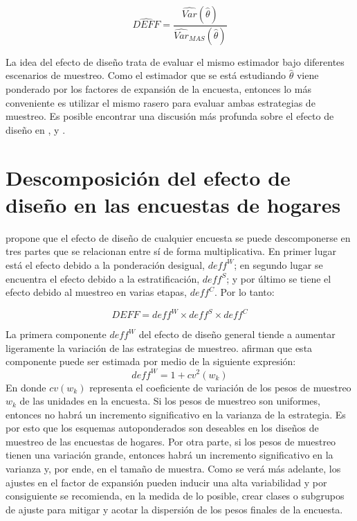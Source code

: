 \documentclass[
  10pt,
  spanish,
]{book}
\begin{document}
\[
\widehat{DEFF} = \frac{\widehat{Var}(\hat\theta)}{\widehat{Var}_{MAS}(\hat{\theta})}
\]

La idea del efecto de diseño trata de evaluar el mismo estimador bajo diferentes escenarios de muestreo. Como el estimador que se está estudiando \(\hat \theta\) viene ponderado por los factores de expansión de la encuesta, entonces lo más conveniente es utilizar el mismo rasero para evaluar ambas estrategias de muestreo. Es posible encontrar una discusión más profunda sobre el efecto de diseño en \citet[sección 4.]{Gambino_2009}, \citet[página 188]{Sarndal_Swensson_Wretman_2003} y \citet[página 101]{Gutierrez_Zhang_Montano_2016}.

\hypertarget{descomposiciuxf3n-del-efecto-de-diseuxf1o-en-las-encuestas-de-hogares}{%
\section{Descomposición del efecto de diseño en las encuestas de hogares}\label{descomposiciuxf3n-del-efecto-de-diseuxf1o-en-las-encuestas-de-hogares}}

\citet{Park_2003} propone que el efecto de diseño de cualquier encuesta se puede descomponerse en tres partes que se relacionan entre sí de forma multiplicativa. En primer lugar está el efecto debido a la ponderación desigual, \(deff^W\); en segundo lugar se encuentra el efecto debido a la estratificación, \(deff^S\); y por último se tiene el efecto debido al muestreo en varias etapas, \(deff^C\). Por lo tanto:

\[
DEFF = deff^W \times deff^S \times deff^C
\]

La primera componente \(deff^W\) del efecto de diseño general tiende a aumentar ligeramente la variación de las estrategias de muestreo. \citet{Valliant_Dever_Kreuter_2018} afirman que esta componente puede ser estimada por medio de la siguiente expresión:
\[
deff^W = 1 + cv^2(w_k)
\]
En donde \(cv(w_k)\) representa el coeficiente de variación de los pesos de muestreo \(w_k\) de las unidades en la encuesta. Si los pesos de muestreo son uniformes, entonces no habrá un incremento significativo en la varianza de la estrategia. Es por esto que los esquemas autoponderados son deseables en los diseños de muestreo de las encuestas de hogares. Por otra parte, si los pesos de muestreo tienen una variación grande, entonces habrá un incremento significativo en la varianza y, por ende, en el tamaño de muestra. Como se verá más adelante, los ajustes en el factor de expansión pueden inducir una alta variabilidad y por consiguiente se recomienda, en la medida de lo posible, crear clases o subgrupos de ajuste para mitigar y acotar la dispersión de los pesos finales de la encuesta.
\end{document}
